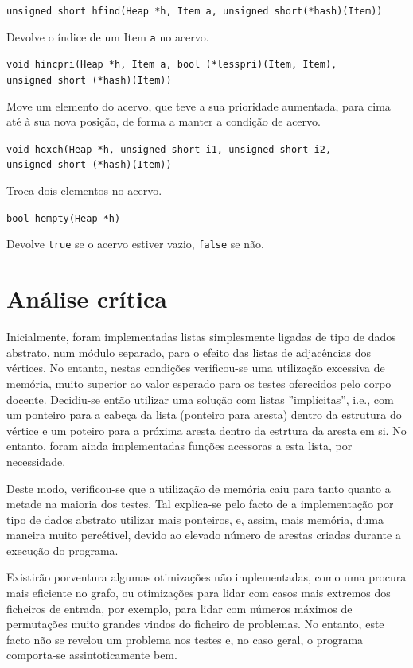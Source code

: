 \documentclass[portuguese, a4paper]{article}
\newcommand\tu[0]{\textunderscore}
\begin{document}
\begin{itemize}
		\par\null\par
		\texttt{unsigned short h\tu find(Heap *h, Item a, unsigned short(*hash)(Item))}
		\par
		Devolve o índice de um Item \texttt{a} no acervo.

		\par\null\par
		\texttt{void h\tu inc\tu pri(Heap *h, Item a, bool (*less\tu pri)(Item, Item), \\
		unsigned short (*hash)(Item))}
		\par
		Move um elemento do acervo, que teve a sua prioridade aumentada, para
		cima até à sua nova posição, de forma a manter a condição de acervo.

		\par\null\par
		\texttt{void h\tu exch(Heap *h, unsigned short i1, unsigned short i2, \\
		unsigned short (*hash)(Item))}
		\par
		Troca dois elementos no acervo.

		\par\null\par
		\texttt{bool h\tu empty(Heap *h)}
		\par
		Devolve \texttt{true} se o acervo estiver vazio, \texttt{false} se não.
	\end{itemize}


\section{Análise crítica}
\label{sec:analise}
	\par
	Inicialmente, foram implementadas listas simplesmente ligadas de tipo de
	dados abstrato, num módulo separado, para o efeito das listas de adjacências
	dos vértices. No entanto, nestas condições verificou-se uma utilização
	excessiva de memória, muito superior ao valor esperado para os testes
	oferecidos pelo corpo docente. Decidiu-se então utilizar uma solução com
	listas ''implícitas'', i.e., com um ponteiro para a cabeça da lista
	(ponteiro para aresta) dentro da estrutura do vértice e um poteiro para a
	próxima aresta dentro da estrtura da aresta em si. No entanto, foram ainda
	implementadas funções acessoras a esta lista, por necessidade.
	\par
	Deste modo, verificou-se que a utilização de memória caiu para tanto quanto
	a metade na maioria dos testes. Tal explica-se pelo facto de a implementação
	por tipo de dados abstrato utilizar mais ponteiros, e, assim, mais memória,
	duma maneira muito percétivel, devido ao elevado número de arestas criadas
	durante a execução do programa.
	\par\null\par
	Existirão porventura algumas otimizações não implementadas, como uma
	procura mais eficiente no grafo, ou otimizações para lidar com casos mais
	extremos dos ficheiros de entrada, por exemplo, para lidar com números
	máximos de permutações muito grandes vindos do ficheiro de problemas. No
	entanto, este facto não se revelou um problema nos testes e, no caso geral,
	o programa comporta-se assintoticamente bem.
\end{document}
